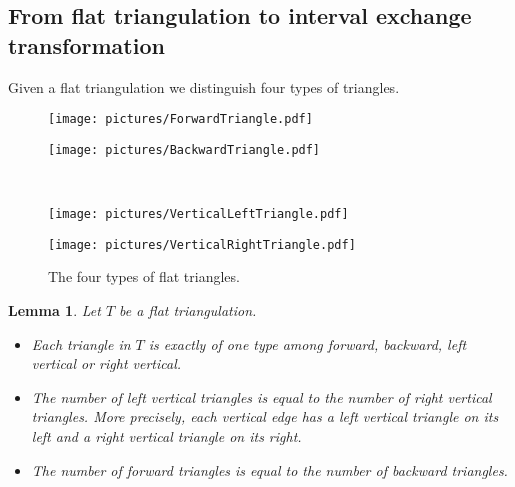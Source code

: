 \documentclass[a4paper,12pt]{article}
\newtheorem{lemma}[definition]{Lemma}
\begin{document}
\subsection{From flat triangulation to interval exchange transformation}
Given a flat triangulation we distinguish four types of triangles.
\begin{figure}[!ht]\begin{center}
\begin{minipage}{0.4\textwidth}
\begin{center}\texttt{[image: pictures/ForwardTriangle.pdf]}\end{center}
\end{minipage}
\hspace{0.1\textwidth}
\begin{minipage}{0.4\textwidth}
\begin{center}\texttt{[image: pictures/BackwardTriangle.pdf]}\end{center}
\end{minipage} \\
\begin{minipage}{0.4\textwidth}
\begin{center}\texttt{[image: pictures/VerticalLeftTriangle.pdf]}\end{center}
\end{minipage}
\hspace{0.1\textwidth}
\begin{minipage}{0.4\textwidth}
\begin{center}\texttt{[image: pictures/VerticalRightTriangle.pdf]}\end{center}
\end{minipage}
\caption{The four types of flat triangles.}
\end{center}\end{figure}
\begin{lemma}
Let $T$ be a flat triangulation.
\begin{itemize}
\item Each triangle in $T$ is exactly of one type among forward, backward, left vertical or right vertical.
\item The number of left vertical triangles is equal to the number of right vertical triangles. More precisely, each vertical
edge has a left vertical triangle on its left and a right vertical triangle on its right.
\item The number of forward triangles is equal to the number of backward triangles.
\end{itemize}
\end{lemma}
\end{document}
